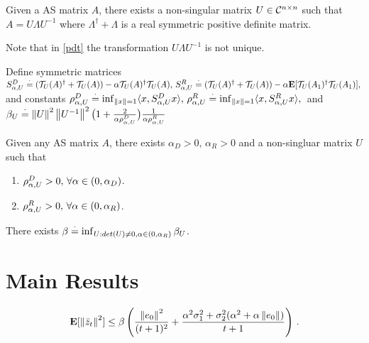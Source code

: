 \documentclass{article}
\begin{document}
\begin{definition}[Admissible]
\end{definition}


\begin{definition}
\end{definition}

\begin{lemma}\label{pdt}
Given a AS matrix $A$, there exists a non-singular matrix $U\in \mathcal{C}^{n\times n}$ such that $A=U\Lambda U^{-1}$ where $\Lambda^\dag+\Lambda$ is a real symmetric positive definite matrix.
\end{lemma}
Note that in \cref{pdt} the transformation $U\Lambda U^{-1}$ is not unique.
\begin{example}
\end{example}

\begin{definition}
Define symmetric matrices
$
S^D_{\alpha,U} \stackrel{\cdot}{=}(\mathcal{T}_U(A)^\dag+\mathcal{T}_U(A))-\alpha \mathcal{T}_U(A)^\dag \mathcal{T}_U(A),\,
S^R_{\alpha,U} \stackrel{\cdot}{=}(\mathcal{T}_U(A)^\dag+\mathcal{T}_U(A))-\alpha \mathbf{E}[\mathcal{T}_U(A_1)^\dag \mathcal{T}_U(A_1)],\,
$
and constants
$\rho^D_{\alpha,U} \stackrel{\cdot}{=} \inf_{\left\| x\right\|=1} \langle x,S^D_{\alpha,U} x\rangle,\, \rho^R_{\alpha,U} \stackrel{\cdot}{=} \inf_{\left\| x\right\|=1} \langle x,S^R_{\alpha,U} x\rangle,\,$ and $\beta_U\stackrel{\cdot}{=} \left\| U\right\|^2\left\| U^{-1}\right\|^2 \big(1+\frac2{\alpha\rho^D_{\alpha,U}}\big)\frac{1}{\alpha \rho^R_{\alpha,U}}$
\end{definition}
\begin{lemma}
Given any AS matrix $A$, there exists $\alpha_D>0,\,\alpha_R>0$ and a non-singluar matrix $U$ such that
\begin{enumerate}
\item $\rho^D_{\alpha,U}>0,\,\forall \alpha \in (0,\alpha_D)$.
\item $\rho^R_{\alpha,U}>0,\,\forall \alpha \in (0,\alpha_R)$.
\end{enumerate}
\end{lemma}
\begin{corollary}
There exists $\beta\stackrel{\cdot}{=}\inf_{U : det(U)\neq 0,\alpha\in (0,\alpha_R)} \beta_U$.
\end{corollary}
\section{Main Results}
\begin{theorem}
\begin{align}
\mathbf{E}[\left\| \bar{z}_t\right\|^2]
\leq \beta
\left(\frac{\left\| e_0\right\|^2}{(t+1)^2}+ \frac{\alpha^2{\sigma}_1^2+ {\sigma}_2^2 (\alpha^2+\alpha \left\| e_0\right\|)}{t+1} \right)\,.
\end{align}
\end{theorem}
\end{document}

